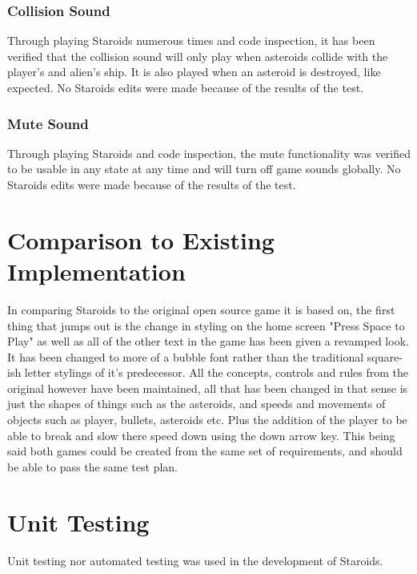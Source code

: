 \documentclass[12pt, titlepage]{article}
\begin{document}
\subsubsection{Collision Sound}
Through playing Staroids numerous times and code inspection, it has been verified that the collision sound will only play when asteroids collide with the player's and alien's ship. It is also played when an asteroid is destroyed, like expected. No Staroids edits were made because of the results of the test.
\subsubsection{Mute Sound}
Through playing Staroids and code inspection, the mute functionality was verified to be usable in any state at any time and will turn off game sounds globally. No Staroids edits were made because of the results of the test.

\section{Comparison to Existing Implementation}

In comparing Staroids to the original open source game it is based on, the first thing that jumps out is the change in styling on the home screen "Press Space to Play" as well as all of the other text in the game has been given a revamped look. It has been changed to more of a bubble font rather than the traditional square-ish letter stylings of it's predecessor. All the concepts, controls and rules from the original however have been maintained, all that has been changed in that sense is just the shapes of things such as the asteroids, and speeds and movements of objects such as player, bullets, asteroids etc. Plus the addition of the player to be able to break and slow there speed down using the down arrow key. This being said both games could be created from the same set of requirements, and should be able to pass the same test plan.

\section{Unit Testing}
Unit testing nor automated testing was used in the development of Staroids.
\end{document}
